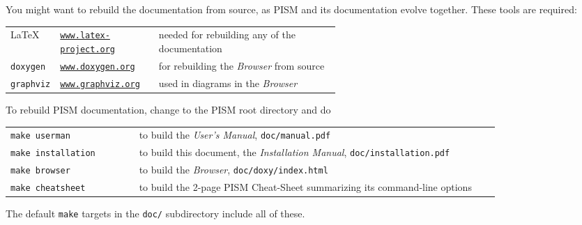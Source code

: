 \documentclass[11pt,final]{amsart}
\renewcommand{\t}[1]{\texttt{#1}}
\begin{document}
You might want to rebuild the documentation from source, as PISM and its documentation evolve together.  These tools are required:
\bigskip
\begin{center}
  \begin{tabular*}{0.9\linewidth}{llp{0.55\linewidth}}
    \toprule
    \LaTeX & \href{http://www.latex-project.org/}{\t{www.latex-project.org}} &  needed for rebuilding any of the documentation \\
    \texttt{doxygen}\index{doxygen} & \href{http://www.stack.nl/~dimitri/doxygen/}{\t{www.doxygen.org}} &  for rebuilding the \emph{Browser} from source  \\
    \texttt{graphviz}\index{graphviz} & \href{http://www.graphviz.org/}{\t{www.graphviz.org}} &  used in diagrams in the \emph{Browser}  \\
    \bottomrule
  \end{tabular*}
\end{center}
\bigskip
\noindent To rebuild PISM documentation, change to the PISM root directory and do
\begin{center}
  \begin{tabular}{p{0.25\linewidth}p{0.7\linewidth}}
    \texttt{make userman} & to build the \emph{User's Manual}, \texttt{doc/manual.pdf}\\
    \texttt{make installation} & to build this document, the \emph{Installation Manual}, \texttt{doc/installation.pdf}\\
    \texttt{make browser} & to build the \emph{Browser}, \texttt{doc/doxy/index.html}\\
    \texttt{make cheatsheet} & to build the 2-page PISM Cheat-Sheet summarizing its command-line options\\
  \end{tabular}
\end{center}
The default \texttt{make} targets in the \texttt{doc/} subdirectory include all of these.
\end{document}
